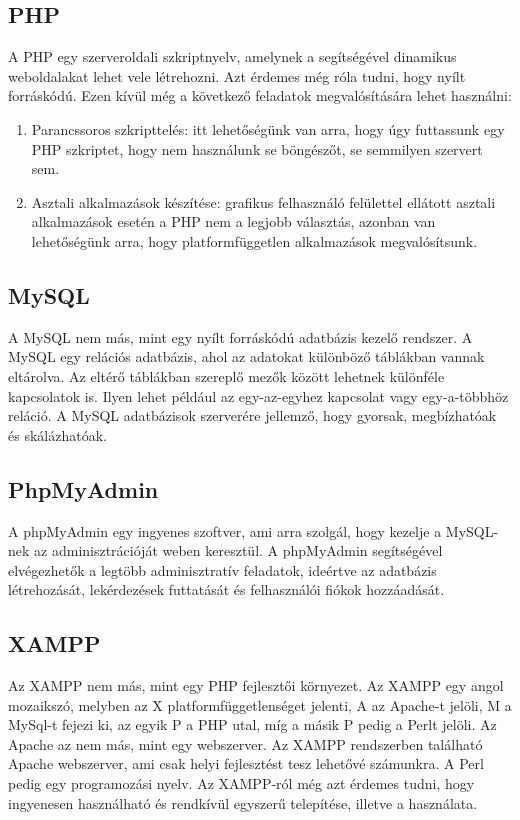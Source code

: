 \documentclass[]{thesis-ekf}
\theoremstyle{definition}
\theoremstyle{remark}
\begin{document}
	\subsection{PHP}
		A PHP egy szerveroldali szkriptnyelv, amelynek a segítségével dinamikus weboldalakat lehet vele létrehozni. Azt érdemes még róla tudni, hogy nyílt forráskódú. Ezen kívül még a következő feladatok megvalósítására lehet használni:
		\begin{enumerate}
			\item Parancssoros szkripttelés: itt lehetőségünk van arra, hogy úgy futtassunk egy PHP szkriptet, hogy nem használunk se böngészőt, se semmilyen szervert sem.
			\item Asztali alkalmazások készítése: grafikus felhasználó felülettel ellátott asztali alkalmazások esetén a PHP nem a legjobb választás, azonban van lehetőségünk arra, hogy platformfüggetlen alkalmazások megvalósítsunk.
		\end{enumerate}
		\cite{PHP}
	\subsection{MySQL}
		A MySQL nem más, mint egy nyílt forráskódú adatbázis kezelő rendszer. A MySQL egy relációs adatbázis, ahol az adatokat különböző táblákban vannak eltárolva. Az eltérő táblákban szereplő mezők között lehetnek különféle kapcsolatok is. Ilyen lehet például az egy-az-egyhez kapcsolat vagy egy-a-többhöz reláció. A MySQL adatbázisok szerverére jellemző, hogy gyorsak, megbízhatóak és skálázhatóak.
		\cite{MySQL}
	\subsection{PhpMyAdmin}
		A phpMyAdmin egy ingyenes szoftver, ami arra szolgál, hogy kezelje a MySQL-nek az adminisztrációját weben keresztül. A phpMyAdmin segítségével elvégezhetők a legtöbb adminisztratív feladatok, ideértve az adatbázis létrehozását, lekérdezések futtatását és felhasználói fiókok hozzáadását. \cite{PhpMyAdmin}
	\subsection{XAMPP}
		Az XAMPP nem más, mint egy PHP fejlesztői környezet. Az XAMPP egy angol mozaikszó, melyben az X platformfüggetlenséget jelenti, A az Apache-t jelöli, M a MySql-t fejezi ki, az egyik P a PHP utal, míg a másik P pedig a Perlt jelöli. Az Apache az nem más, mint egy webszerver. Az XAMPP rendszerben található Apache webszerver, ami csak helyi fejlesztést tesz lehetővé számunkra. A Perl pedig egy programozási nyelv. Az XAMPP-ról még azt érdemes tudni, hogy ingyenesen használható és rendkívül egyszerű telepítése, illetve a használata. \cite{XAMPP}
\end{document}
